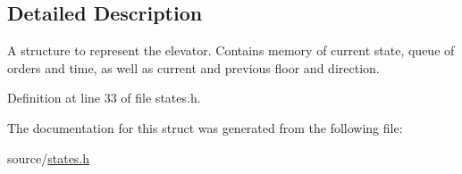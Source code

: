 \subsection{Detailed Description}
A structure to represent the elevator. Contains memory of current state, queue of orders and time, as well as current and previous floor and direction. 

Definition at line 33 of file states.\+h.



The documentation for this struct was generated from the following file\+:\begin{DoxyCompactItemize}
\item 
source/\hyperlink{states_8h}{states.\+h}\end{DoxyCompactItemize}
